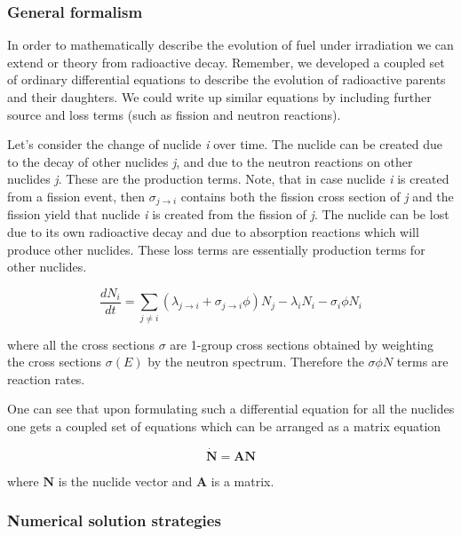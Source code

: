 \subsubsection*{General formalism}

In order to mathematically describe the  evolution of fuel under irradiation we can extend or theory from radioactive decay. Remember, we developed a coupled set of ordinary differential equations to describe the evolution of radioactive parents and their daughters. We could write up similar equations by including further source and loss terms (such as fission and neutron reactions).

Let's consider the change of nuclide \textit{i} over time. The nuclide can be created due to the decay of other nuclides \textit{j}, and due to the neutron reactions on other nuclides \textit{j}. These are the production terms. Note, that in case nuclide \textit{i} is created from a fission event, then $\sigma_{j\rightarrow i}$ contains both the fission cross section of \textit{j} and the fission yield that nuclide \textit{i} is created from the fission of \textit{j}. The nuclide can be lost due to its own radioactive decay and due to absorption reactions which will produce other nuclides. These loss terms are essentially production terms for other nuclides.

\begin{equation}
\frac{dN_{i}}{dt} =\sum _{j\neq i}\left( \lambda _{j\rightarrow i} +\sigma _{j\rightarrow i} \phi\right) N_{j} -\lambda _{i} N_{i} -\sigma _{i} \phi N_{i}
\end{equation}

\noindent where all the cross sections $\sigma$ are 1-group cross sections obtained by weighting the cross sections $\sigma(E)$ by the neutron spectrum. Therefore the $\sigma\phi N$ terms are reaction rates.

One can see that upon formulating such a differential equation for all the nuclides one gets a coupled set of equations which can be arranged as a matrix equation

\begin{equation}
\dot{\mathbf{N}}=\mathbf{AN}
\end{equation}

\noindent where $\mathbf{N}$ is the nuclide vector and $\mathbf{A}$ is a matrix.

\subsubsection*{Numerical solution strategies}

